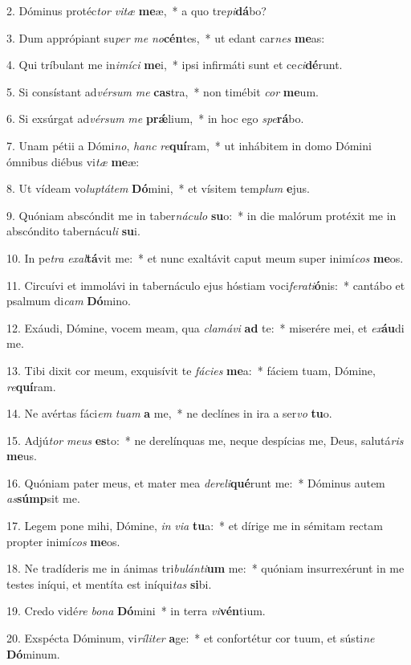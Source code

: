 2. Dóminus protéc\textit{tor} \textit{vi}\textit{tæ} \textbf{me}æ,~*  a quo tre\textit{pi}\textbf{dá}bo?\

3. Dum apprópiant su\textit{per} \textit{me} \textit{no}\textbf{cén}tes,~*  ut edant car\textit{nes} \textbf{me}as:\

4. Qui tríbulant me in\textit{i}\textit{mí}\textit{ci} \textbf{me}i,~*  ipsi infirmáti sunt et ce\textit{ci}\textbf{dé}runt.\

5. Si consístant ad\textit{vér}\textit{sum} \textit{me} \textbf{cas}tra,~*  non timébit \textit{cor} \textbf{me}um.\

6. Si exsúrgat ad\textit{vér}\textit{sum} \textit{me} \textbf{prǽ}lium,~*  in hoc ego \textit{spe}\textbf{rá}bo.\

7. Unam pétii a Dómi\textit{no}, \textit{hanc} \textit{re}\textbf{quí}ram,~*  ut inhábitem in domo Dómini ómnibus diébus vi\textit{tæ} \textbf{me}æ:\

8. Ut vídeam vo\textit{lup}\textit{tá}\textit{tem} \textbf{Dó}mini,~*  et vísitem tem\textit{plum} \textbf{e}jus.\

9. Quóniam abscóndit me in taber\textit{ná}\textit{cu}\textit{lo} \textbf{su}o:~*  in die malórum protéxit me in abscóndito tabernácu\textit{li} \textbf{su}i.\

10. In pe\textit{tra} \textit{ex}\textit{al}\textbf{tá}vit me:~*  et nunc exaltávit caput meum super inimí\textit{cos} \textbf{me}os.\

11. Circuívi et immolávi in tabernáculo ejus hóstiam voci\textit{fe}\textit{ra}\textit{ti}\textbf{ó}nis:~*  cantábo et psalmum di\textit{cam} \textbf{Dó}mino.\

12. Exáudi, Dómine, vocem meam, qua \textit{cla}\textit{má}\textit{vi} \textbf{ad} te:~*  miserére mei, et \textit{ex}\textbf{áu}di me.\

13. Tibi dixit cor meum, exquisívit te \textit{fá}\textit{ci}\textit{es} \textbf{me}a:~*  fáciem tuam, Dómine, \textit{re}\textbf{quí}ram.\

14. Ne avértas fáci\textit{em} \textit{tu}\textit{am} \textbf{a} me,~*  ne declínes in ira a ser\textit{vo} \textbf{tu}o.\

15. Adjú\textit{tor} \textit{me}\textit{us} \textbf{es}to:~*  ne derelínquas me, neque despícias me, Deus, salutá\textit{ris} \textbf{me}us.\

16. Quóniam pater meus, et mater mea \textit{de}\textit{re}\textit{li}\textbf{qué}runt me:~*  Dóminus autem \textit{as}\textbf{súmp}sit me.\

17. Legem pone mihi, Dómine, \textit{in} \textit{vi}\textit{a} \textbf{tu}a:~*  et dírige me in sémitam rectam propter inimí\textit{cos} \textbf{me}os.\

18. Ne tradíderis me in ánimas tri\textit{bu}\textit{lán}\textit{ti}\textbf{um} me:~*  quóniam insurrexérunt in me testes iníqui, et mentíta est iníqui\textit{tas} \textbf{si}bi.\

19. Credo vidé\textit{re} \textit{bo}\textit{na} \textbf{Dó}mini~*  in terra \textit{vi}\textbf{vén}tium.\

20. Exspécta Dóminum, vi\textit{rí}\textit{li}\textit{ter} \textbf{a}ge:~*  et confortétur cor tuum, et sústi\textit{ne} \textbf{Dó}minum.\

